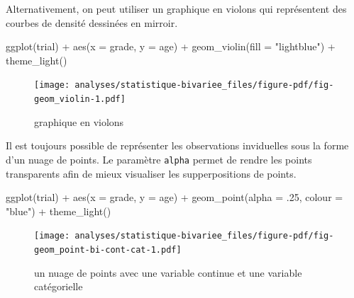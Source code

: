 \documentclass[
  letterpaper,
  DIV=11,
  numbers=noendperiod,
  oneside]{scrreprt}
\newenvironment{Shaded}{\begin{snugshade}}{\end{snugshade}}
\newcommand{\AttributeTok}[1]{\textcolor[rgb]{0.40,0.45,0.13}{#1}}
\newcommand{\DecValTok}[1]{\textcolor[rgb]{0.68,0.00,0.00}{#1}}
\newcommand{\FunctionTok}[1]{\textcolor[rgb]{0.28,0.35,0.67}{#1}}
\newcommand{\NormalTok}[1]{\textcolor[rgb]{0.00,0.23,0.31}{#1}}
\newcommand{\SpecialCharTok}[1]{\textcolor[rgb]{0.37,0.37,0.37}{#1}}
\newcommand{\StringTok}[1]{\textcolor[rgb]{0.13,0.47,0.30}{#1}}
\begin{document}
Alternativement, on peut utiliser un graphique en violons qui
représentent des courbes de densité dessinées en mirroir.

\begin{Shaded}
\begin{Highlighting}[]
\FunctionTok{ggplot}\NormalTok{(trial) }\SpecialCharTok{+}
  \FunctionTok{aes}\NormalTok{(}\AttributeTok{x =}\NormalTok{ grade, }\AttributeTok{y =}\NormalTok{ age) }\SpecialCharTok{+}
  \FunctionTok{geom\_violin}\NormalTok{(}\AttributeTok{fill =} \StringTok{"lightblue"}\NormalTok{) }\SpecialCharTok{+}
  \FunctionTok{theme\_light}\NormalTok{()}
\end{Highlighting}
\end{Shaded}

\begin{figure}[H]

{\centering \texttt{[image: analyses/statistique-bivariee\_files/figure-pdf/fig-geom\_violin-1.pdf]}

}

\caption{\label{fig-geom_violin}graphique en violons}

\end{figure}

Il est toujours possible de représenter les observations inviduelles
sous la forme d'un nuage de points. Le paramètre \texttt{alpha} permet
de rendre les points transparents afin de mieux visualiser les
supperpositions de points.

\begin{Shaded}
\begin{Highlighting}[]
\FunctionTok{ggplot}\NormalTok{(trial) }\SpecialCharTok{+}
  \FunctionTok{aes}\NormalTok{(}\AttributeTok{x =}\NormalTok{ grade, }\AttributeTok{y =}\NormalTok{ age) }\SpecialCharTok{+}
  \FunctionTok{geom\_point}\NormalTok{(}\AttributeTok{alpha =}\NormalTok{ .}\DecValTok{25}\NormalTok{, }\AttributeTok{colour =} \StringTok{"blue"}\NormalTok{) }\SpecialCharTok{+}
  \FunctionTok{theme\_light}\NormalTok{()}
\end{Highlighting}
\end{Shaded}

\begin{figure}[H]

{\centering \texttt{[image: analyses/statistique-bivariee\_files/figure-pdf/fig-geom\_point-bi-cont-cat-1.pdf]}

}

\caption{\label{fig-geom_point-bi-cont-cat}un nuage de points avec une
variable continue et une variable catégorielle}

\end{figure}
\end{document}
